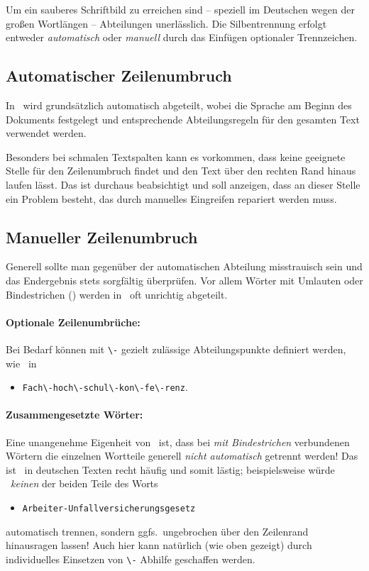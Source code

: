 Um ein sauberes Schriftbild zu erreichen sind -- speziell im Deutschen wegen
der großen Wortlängen -- Abteilungen unerlässlich. Die Silbentrennung erfolgt
entweder \emph{automatisch} oder \emph{manuell} durch das Einfügen optionaler
Trennzeichen.

\subsection{Automatischer Zeilenumbruch}

In \latex\ wird grundsätzlich automatisch abgeteilt, wobei die Sprache am
Beginn des Dokuments festgelegt und entsprechende Abteilungsregeln für den
gesamten Text verwendet werden.

Besonders bei schmalen Textspalten kann es vorkommen, dass \latex keine
geeignete Stelle für den Zeilenumbruch findet und den Text über den rechten
Rand hinaus laufen lässt. Das ist durchaus beabsichtigt und soll anzeigen,
dass an dieser Stelle ein Problem besteht, das durch manuelles Eingreifen
repariert werden muss.

\subsection{Manueller Zeilenumbruch}

Generell sollte man gegenüber der automatischen Abteilung misstrauisch sein
und das Endergebnis stets sorgfältig überprüfen. Vor allem Wörter mit
Umlauten oder Bindestrichen (\su) werden in \latex\ oft unrichtig abgeteilt.

\paragraph{Optionale Zeilenumbrüche:} Bei Bedarf können mit \verb!\-! gezielt
zulässige Abteilungspunkte definiert werden, wie \zB\ in
%
\begin{itemize}
    \item[] \verb!Fach\-hoch\-schul\-kon\-fe\-renz!.
\end{itemize}

\paragraph{Zusammengesetzte Wörter:} Eine unangenehme Eigenheit von \latex\
ist, dass bei \emph{mit Bindestrichen} verbundenen Wörtern die einzelnen
Wortteile generell \emph{nicht automatisch} getrennt werden! Das ist \va\ in
deutschen Texten recht häufig und somit lästig; beispielsweise würde \latex\
\emph{keinen} der beiden Teile des Worts
%
\begin{itemize}
    \item[] \verb!Arbeiter-Unfallversicherungsgesetz!
\end{itemize}
%
automatisch trennen, sondern ggfs.\ ungebrochen über den Zeilenrand hinausragen
lassen! Auch hier kann natürlich (wie oben gezeigt) durch individuelles
Einsetzen von \verb!\-! Abhilfe geschaffen werden.

